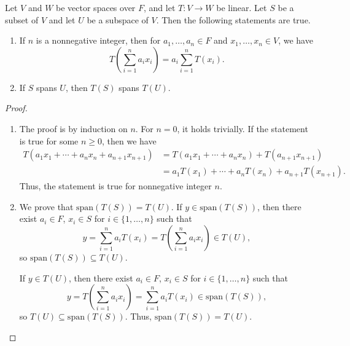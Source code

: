\begin{theorem}\label{thm:linear-span}
  Let $V$ and $W$ be vector spaces over $F$, and let $T: V \to W$ be linear.
  Let $S$ be a subset of $V$ and let $U$ be a subspace of $V$.
  Then the following statements are true.
  \begin{enumerate}
    \item If $n$ is a nonnegative integer, then for $a_1, \dots, a_n \in F$
      and $x_1, \dots, x_n \in V$, we have
      \begin{equation*}
        T\left(\sum_{i=1}^n a_ix_i\right) = a_i\sum_{i=1}^n T(x_i).
      \end{equation*}
    \item If $S$ spans $U$, then $T(S)$ spans $T(U)$.
  \end{enumerate}
\end{theorem}
\begin{proof} \leavevmode
  \begin{enumerate}
    \item The proof is by induction on $n$. For $n = 0$, it holds trivially.
      If the statement is true for some $n \geq 0$, then we have
      \begin{align*}
        T(a_1x_1 + \cdots + a_nx_n + a_{n+1}x_{n+1})
        &= T(a_1x_1 + \cdots + a_nx_n) + T(a_{n+1}x_{n+1}) \\
        &= a_1T(x_1) + \cdots + a_nT(x_n) + a_{n+1}T(x_{n+1}).
      \end{align*}
      Thus, the statement is true for nonnegative integer $n$.
    \item We prove that $\mathrm{span}(T(S)) = T(U)$.
      If $y \in \mathrm{span}(T(S))$, then there exist
      $a_i \in F$, $x_i \in S$ for $i \in \{1, \dots, n\}$ such that
      \begin{equation*}
        y = \sum_{i=1}^n a_iT(x_i)
          = T\left(\sum_{i=1}^n a_ix_i\right) \in T(U),
      \end{equation*}
      so $\mathrm{span}(T(S)) \subseteq T(U)$.

      If $y \in T(U)$, then there exist
      $a_i \in F$, $x_i \in S$ for $i \in \{1, \dots, n\}$ such that
      \begin{equation*}
        y = T\left(\sum_{i=1}^n a_ix_i\right)
          = \sum_{i=1}^n a_iT(x_i) \in \mathrm{span}(T(S)),
      \end{equation*}
      so $T(U) \subseteq \mathrm{span}(T(S))$.
      Thus, $\mathrm{span}(T(S)) = T(U)$. \qedhere
  \end{enumerate}
\end{proof}

